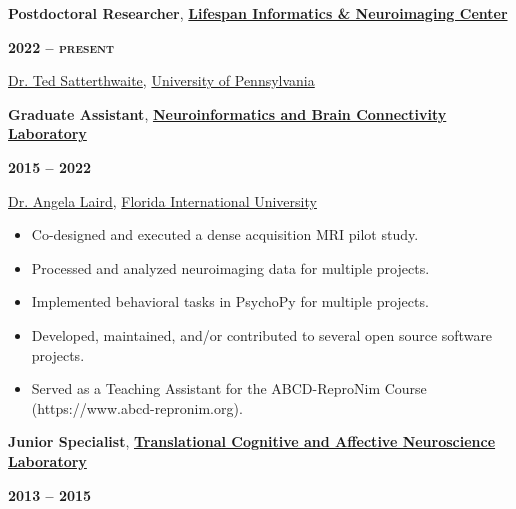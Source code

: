 \documentclass[10pt]{article}
\begin{document}
\begin{minipage}[t]{.8\linewidth}
	\flushleft
	\noindent
	\textbf{Postdoctoral Researcher},
	\href{https://www.pennlinc.io}
	{\textbf{Lifespan Informatics \& Neuroimaging Center}}
	\end{minipage}
	\hfill
	\begin{minipage}[t]{.2\linewidth}
	\flushright
	\noindent
	\textsc{\textbf{2022 -- present}}
\end{minipage}

\href{https://www.pennlinc.io/team/Ted-Satterthwaite}{Dr. Ted Satterthwaite},
\href{https://www.upenn.edu}{University of Pennsylvania}

\bigskip

\begin{minipage}[t]{.8\linewidth}
	\flushleft
	\noindent
	\textbf{Graduate Assistant},
	\href{https://nbclab.github.io}
	{\textbf{Neuroinformatics and Brain Connectivity Laboratory}}
	\end{minipage}
	\hfill
	\begin{minipage}[t]{.2\linewidth}
	\flushright
	\noindent
	\textsc{\textbf{2015 -- 2022}}
\end{minipage}

\href{https://nbclab.github.io/team/laird-angela}{Dr. Angela Laird},
\href{http://www.fiu.edu}{Florida International University}

\begin{itemize}[noitemsep, nolistsep]

\item Co-designed and executed a dense acquisition MRI pilot study.

\item Processed and analyzed neuroimaging data for multiple projects.

\item Implemented behavioral tasks in PsychoPy for multiple projects.

\item Developed, maintained, and/or contributed to several open source software projects.

\item Served as a Teaching Assistant for the ABCD-ReproNim Course (https://www.abcd-repronim.org).

\end{itemize}

\bigskip

\begin{minipage}[t]{.85\linewidth}
	\flushleft
	\noindent
	\textbf{Junior Specialist},
	\href{http://carterlab.ucdavis.edu/front/index.php}
	{\textbf{Translational Cognitive and Affective Neuroscience Laboratory}}
	\end{minipage}
	\hfill
	\begin{minipage}[t]{.15\linewidth}
	\flushright
	\noindent
	\textsc{\textbf{2013 -- 2015}}
\end{minipage}
\end{document}
